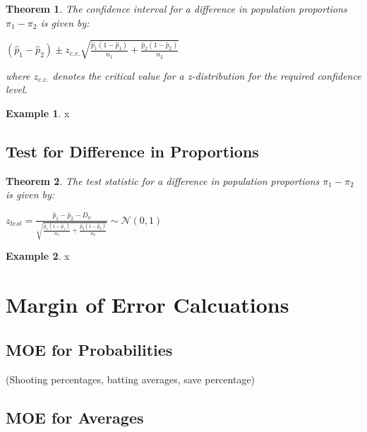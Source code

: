 \documentclass[
  11pt,
]{book}
\newtheorem{theorem}{Theorem}[chapter]
\theoremstyle{definition}
\theoremstyle{definition}
\newtheorem{example}{Example}[chapter]
\theoremstyle{definition}
\theoremstyle{definition}
\theoremstyle{remark}
\begin{document}
\begin{theorem}
The confidence interval for a difference in population proportions \(\pi_1 - \pi_2\) is given by:

\((\hat{p}_1 - \hat{p}_2) \pm z_{c.v.}\sqrt{\frac{\hat{p}_1(1-\hat{p}_1)}{n_1}+\frac{\hat{p}_2(1-\hat{p}_2)}{n_2}}\)

where \(z_{c.v.}\) denotes the critical value for a z-distribution for the required confidence level.
\end{theorem}

\begin{example}
x
\end{example}

\newpage

\hypertarget{test-for-difference-in-proportions}{%
\subsection{Test for Difference in Proportions}\label{test-for-difference-in-proportions}}

\begin{theorem}
The test statistic for a difference in population proportions \(\pi_1 - \pi_2\) is given by:

\(z_{test} = \frac{\hat{p}_1 - \hat{p}_2 - D_0}{\sqrt{\frac{\hat{p}_1(1-\hat{p}_1)}{n_1}+\frac{\hat{p}_2(1-\hat{p}_2)}{n_2}}} \sim \mathcal{N}(0,1)\)
\end{theorem}

\begin{example}
x
\end{example}

\newpage

\hypertarget{margin-of-error-calcuations}{%
\section{Margin of Error Calcuations}\label{margin-of-error-calcuations}}

\hypertarget{moe-for-probabilities}{%
\subsection{MOE for Probabilities}\label{moe-for-probabilities}}

(Shooting percentages, batting averages, save percentage)

\hypertarget{moe-for-averages}{%
\subsection{MOE for Averages}\label{moe-for-averages}}
\end{document}

